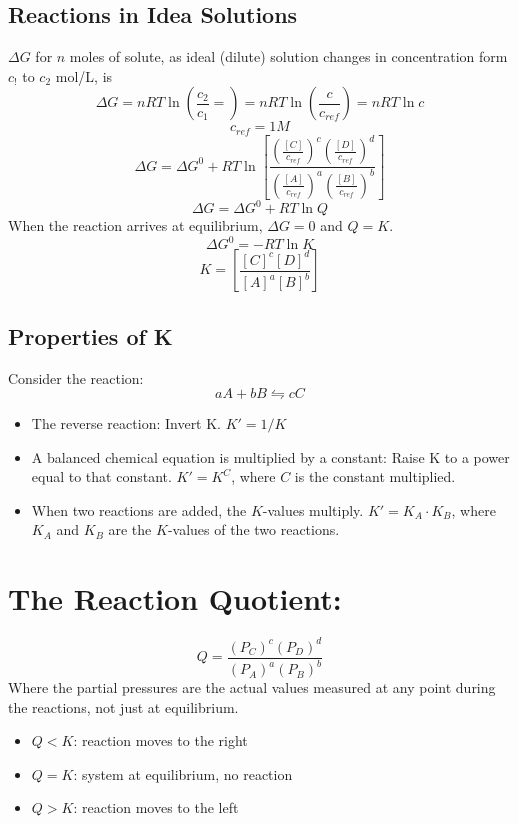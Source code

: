 \documentclass[10pt]{article}
\begin{document}
\subsection*{Reactions in Idea Solutions}
$\Delta G$ for $n$ moles of solute, as ideal (dilute) solution changes in concentration form $c_!$ to $c_2$ mol/L, is
\[\Delta G = nRT \ln \left(\frac{c_2}{c_1} =\right) = nRT \ln \left( \frac{c}{c_{ref}}\right) = nRT \ln c\]
\[c_{ref} = 1 M\]
\[\Delta G = \Delta G^0 + RT \ln \left[\frac{\left(\frac{[C]}{c_{ref}}\right)^c\left(\frac{[D]}{c_{ref}}\right)^d}{\left(\frac{[A]}{c_{ref}}\right)^a \left(\frac{[B]}{c_{ref}}\right)^b}\right]\]
\[\Delta G = \Delta G^0 + RT \ln Q\]
When the reaction arrives at equilibrium, $\Delta G = 0$ and $Q = K$.
\[\Delta G^0 = -RT \ln K\]
\[K = \left[\frac{[C]^c[D]^d}{[A]^a[B]^b}\right]\]

\subsection*{Properties of K}
Consider the reaction:
\[aA + bB \leftrightharpoons cC\]
\begin{itemize}
    \item The reverse reaction: Invert K.  $K' = 1 / K$
    \item A balanced chemical equation is multiplied by a constant: Raise K to a power equal to that constant. $K' = K^C$, where $C$ is the constant multiplied.
    \item When two reactions are added, the $K$-values multiply.  $K' = K_A \cdot K_B$, where $K_A$ and $K_B$ are the $K$-values of the two reactions.
\end{itemize}

\section*{The Reaction Quotient:}
\[Q = \frac{(P_C)^c (P_D)^d}{(P_A)^a (P_B)^b}\]
Where the partial pressures are the actual values measured at any point during the reactions, not just at equilibrium.
\begin{itemize}
    \item $Q < K$: reaction moves to the right
    \item $Q = K$: system at equilibrium, no reaction
    \item $Q > K$: reaction moves to the left
\end{itemize}
\end{document}
